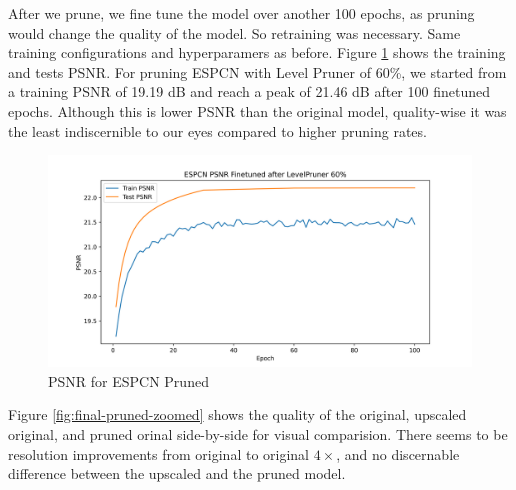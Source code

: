 \documentclass{article}
\begin{document}
After we prune, we fine tune the model over another 100 epochs, as pruning would change the quality of the model. So retraining was necessary. Same training configurations and hyperparamers as before.  Figure \ref{fig:psnr-pruned} shows the training and tests PSNR. For pruning ESPCN with Level Pruner of 60\%, we started from a training PSNR of 19.19 dB and reach a peak of 21.46 dB after 100 finetuned epochs. Although this is lower PSNR than the original model, quality-wise it was the least indiscernible to our eyes compared to higher pruning rates. 

\begin{figure}
    \centerline{\includegraphics[width=6in]{../final/figures/SuperResolutionTwitter_PSNR_pruned.png}}
    \caption{PSNR for ESPCN Pruned}
    \label{fig:psnr-pruned}
\end{figure}


Figure \ref{fig:final-pruned-zoomed} shows the quality of the original, upscaled original, and pruned orinal side-by-side for visual comparision. There seems to be resolution improvements from original to original $4\times$, and no discernable difference between the upscaled and the pruned model.
\end{document}
